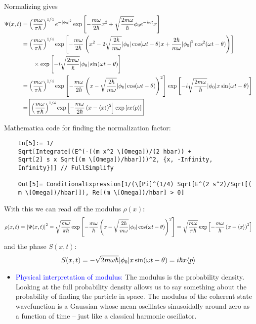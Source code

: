 \documentclass{article}
\theoremstyle{definition}
\newcommand{\f}[2]{\frac{#1}{#2}}
\newcommand{\lp}{\left(}
\newcommand{\rp}{\right)}
\newcommand{\lb}{\left[}
\newcommand{\rb}{\right]}
\begin{document}
\begin{enumerate}[label=(\alph*)]
	Normalizing gives
	\begin{align*}
	\Psi(x,t) 
	&= \lp{\f{m\omega}{\pi \hbar}}\rp^{1/4} e^{-\abs{\phi_0}^2}\exp\lb -\f{m\omega}{2\hbar}x^2 + \sqrt{\f{2m\omega}{\hbar}} \phi_0 e^{-i\omega t} x  \rb \\
	&= \lp{\f{m\omega}{\pi \hbar}}\rp^{1/4} \exp\lb -\f{m\omega}{2\hbar} \lp  x^2 - 2\sqrt{\f{2\hbar}{m\omega}} \abs{\phi_0}\cos(\omega t - \theta) x + \f{2 \hbar}{m\omega}  \abs{\phi_0}^2\cos^2(\omega t - \theta)\rp \rb \\
	&\quad\quad\times  \exp\lb -i\sqrt{\f{2m\omega}{\hbar}}\abs{\phi_0}\sin(\omega t - \theta)  \rb \\
	&= \lp{\f{m\omega}{\pi \hbar}}\rp^{1/4}
	\exp\lb -\f{m\omega}{2\hbar}\lp x - \sqrt{\f{2\hbar}{m\omega}} \abs{\phi_0}\cos(\omega t- \theta) \rp^2 \rb  
	\exp\lb -i\sqrt{\f{2m\omega}{\hbar}}\abs{\phi_0}x\sin(\omega t - \theta)  \rb\\
	&= \boxed{\lp{\f{m\omega}{\pi \hbar}}\rp^{1/4}
	\exp\lb -\f{m\omega}{2\hbar}\lp x - \langle x \rangle \rp^2 \rb  
	\exp\lb i x \langle p \rangle \rb}
	\end{align*}
	
	Mathematica code for finding the normalization factor:
	\begin{lstlisting}
	In[5]:= 1/
	Sqrt[Integrate[(E^(-((m x^2 \[Omega])/(2 hbar)) + 
	Sqrt[2] s x Sqrt[(m \[Omega])/hbar]))^2, {x, -Infinity, 
	Infinity}]] // FullSimplify
	
	Out[5]= ConditionalExpression[1/(\[Pi]^(1/4) Sqrt[E^(2 s^2)/Sqrt[(
	m \[Omega])/hbar]]), Re[(m \[Omega])/hbar] > 0]
	\end{lstlisting}
	
	
	With this we can read off the modulus $\rho(x)$:
	\begin{align*}
	\rho(x,t) = \abs{\Psi(x,t)}^2 = \sqrt{\f{m\omega}{\pi \hbar}} \exp\lb -\f{m\omega}{\hbar}\lp x - \sqrt{\f{2\hbar}{m\omega}} \abs{\phi_0}\cos(\omega t- \theta) \rp^2 \rb  =  \sqrt{\f{m\omega}{\pi \hbar}} \exp\lb - \f{m\omega}{\hbar}\lp x -\langle x \rangle \rp^2 \rb 
	\end{align*}
	and the phase $S(x,t)$:
	\begin{align*}
	S(x,t) = -\sqrt{2m\omega \hbar}\abs{\phi_0} x \sin(\omega t - \theta) = i\hbar x\langle p \rangle 
	\end{align*}


	\begin{itemize}
		\item \textcolor{blue}{Physical interpretation of modulus:} The modulus is the probability density. Looking at the full probability density allows us to say something about the probability of finding the particle in space. The modulus of the coherent state wavefunction is a Gaussian whose mean oscillates sinusoidally around zero as a function of time -- just like a classical harmonic oscillator. 
		

\end{itemize}
\end{enumerate}
\end{document}
